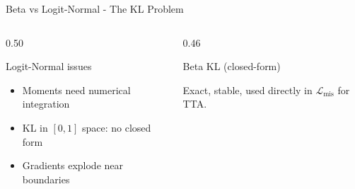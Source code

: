 \documentclass[aspectratio=169]{beamer}
\begin{document}
	\begin{frame}{Beta vs Logit-Normal - The KL Problem}
		\begin{columns}[onlytextwidth]
			\begin{column}{0.50\textwidth}
				\begin{alertblock}{Logit-Normal issues}
					\small
					\begin{itemize}
						\item Moments need numerical integration
						\item KL in $[0,1]$ space: no closed form
						\item Gradients explode near boundaries
					\end{itemize}
				\end{alertblock}
			\end{column}
			\begin{column}{0.46\textwidth}
				\begin{block}{Beta KL (closed-form)}
					\footnotesize
					\vspace{0.3em}

					\small Exact, stable, used directly in $\mathcal{L}_{\text{mis}}$ for TTA.
				\end{block}
			\end{column}
		\end{columns}
		\vspace{0.6em}
		\begin{center}
		\end{center}
	\end{frame}
\end{document}
